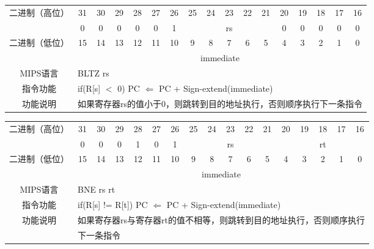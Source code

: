 \begin{table}
\begin{tabular}{|c|c|c|c|c|c|c|c|c|c|c|c|c|c|c|c|c|}
\hline
\multirow{2}{*}{二进制（高位）} &
31&30&29&28&27&26&25&24&23&22&21&20&19&18&17&16\\
\cline{2-17}
&
0&0&0&0&0&
1&
\multicolumn{5}{c|}{rs}&
0&0&0&0&0\\
\hline
\multirow{2}{*}{二进制（低位）} &
15&14&13&12&11&10&9&8&7&6&5&4&3&2&1&0\\
\cline{2-17}
&
\multicolumn{16}{c|}{immediate}\\
\hline
MIPS语言&
\multicolumn{16}{l|}{BLTZ rs}\\
\hline
指令功能&
\multicolumn{16}{l|}{if(R[s] $<$ 0) PC $\Leftarrow$ PC + Sign-extend(immediate)}\\
\hline
功能说明&
\multicolumn{16}{l|}{如果寄存器rs的值小于0，则跳转到目的地址执行，否则顺序执行下一条指令}\\
\hline
\end{tabular}
\end{table}

\begin{table}
\begin{tabular}{|c|c|c|c|c|c|c|c|c|c|c|c|c|c|c|c|c|}
\hline
\multirow{2}{*}{二进制（高位）} &
31&30&29&28&27&26&25&24&23&22&21&20&19&18&17&16\\
\cline{2-17}
&
0&0&0&1&0&
1&
\multicolumn{5}{c|}{rs}&
\multicolumn{5}{c|}{rt}\\
\hline
\multirow{2}{*}{二进制（低位）} &
15&14&13&12&11&10&9&8&7&6&5&4&3&2&1&0\\
\cline{2-17}
&
\multicolumn{16}{c|}{immediate}\\
\hline
MIPS语言&
\multicolumn{16}{l|}{BNE rs rt}\\
\hline
指令功能&
\multicolumn{16}{l|}{if(R[s] != R[t]) PC $\Leftarrow$ PC + Sign-extend(immediate)}\\
\hline
\multirow{2}{*}{功能说明}&
\multicolumn{16}{l|}{如果寄存器rs与寄存器rt的值不相等，则跳转到目的地址执行，否则顺序执行}\\
&\multicolumn{16}{l|}{下一条指令}\\
\hline
\end{tabular}
\end{table}

